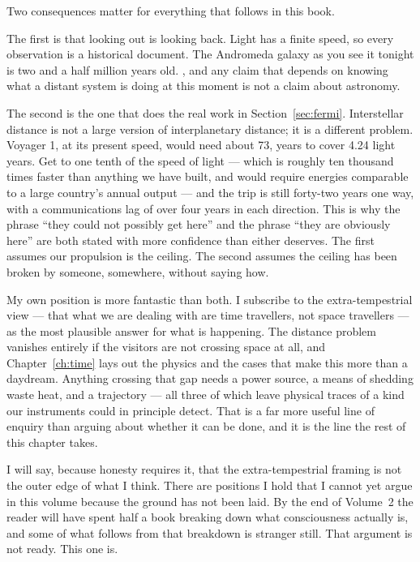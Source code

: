 Two consequences matter for everything that follows in this book.

The first is that looking out is looking back. Light has a finite speed, so every observation
is a historical document. The Andromeda galaxy as you see it tonight is two and a half million
years old. , and any claim
that depends on knowing what a distant system is doing at this moment is not a claim about
astronomy.

The second is the one that does the real work in Section~\ref{sec:fermi}. Interstellar
distance is not a large version of interplanetary distance; it is a different problem. Voyager
1, at its present speed, would need about 73, years to cover 4.24 light years. Get to one
tenth of the speed of light --- which is roughly ten thousand times faster than anything we
have built, and would require energies comparable to a large country's annual output --- and
the trip is still forty-two years one way, with a communications lag of over four years in
each direction. This is why the phrase ``they could not possibly get here'' and the phrase
``they are obviously here'' are both stated with more confidence than either deserves. The
first assumes our propulsion is the ceiling. The second assumes the ceiling has been broken by
someone, somewhere, without saying how.

My own position is more fantastic than both. I subscribe to the extra-tempestrial view ---
that what we are dealing with are time travellers, not space travellers --- as the most
plausible answer for what is happening. The distance problem vanishes entirely if the visitors
are not crossing space at all, and Chapter~\ref{ch:time} lays out the physics and the
cases that make this more than a daydream.  Anything crossing that gap needs a
power source, a means of shedding waste heat, and a trajectory --- all three of which leave
physical traces of a kind our instruments could in principle detect. That is a far more useful
line of enquiry than arguing about whether it can be done, and it is the line the rest of this
chapter takes.

I will say, because honesty requires it, that the extra-tempestrial framing is not the
outer edge of what I think. There are positions I hold that I cannot yet argue in this volume
because the ground has not been laid. By the end of Volume~2 the reader will have spent half
a book breaking down what consciousness actually is, and some of what follows from that
breakdown is stranger still. That argument is not ready. This one is.

